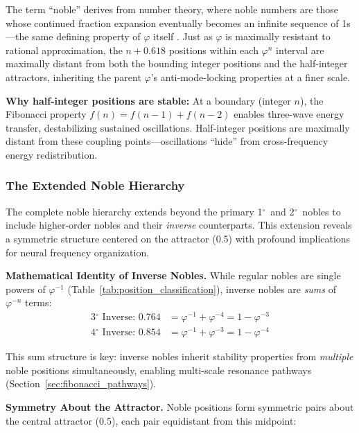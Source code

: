 \documentclass[11pt,a4paper]{article}
\newcommand{\degree}{$^\circ$}  %
\newcommand{\phisym}{\varphi}
\begin{document}
The term ``noble'' derives from number theory, where noble numbers are those whose continued fraction expansion eventually becomes an infinite sequence of 1s---the same defining property of $\phisym$ itself \parencite{hardy1979introduction}. Just as $\phisym$ is maximally resistant to rational approximation, the $n + 0.618$ positions within each $\phisym^n$ interval are maximally distant from both the bounding integer positions and the half-integer attractors, inheriting the parent $\phisym$'s anti-mode-locking properties at a finer scale.

\textbf{Why half-integer positions are stable:} At a boundary (integer $n$), the Fibonacci property $f(n) = f(n-1) + f(n-2)$ enables three-wave energy transfer, destabilizing sustained oscillations. Half-integer positions are maximally distant from these coupling points---oscillations ``hide'' from cross-frequency energy redistribution.

\subsubsection{The Extended Noble Hierarchy}
\label{sec:extended_noble}

The complete noble hierarchy extends beyond the primary 1\degree\ and 2\degree\ nobles to include higher-order nobles and their \textit{inverse} counterparts. This extension reveals a symmetric structure centered on the attractor (0.5) with profound implications for neural frequency organization.

\textbf{Mathematical Identity of Inverse Nobles.}
While regular nobles are single powers of $\phisym^{-1}$ (Table~\ref{tab:position_classification}), inverse nobles are \textit{sums} of $\phisym^{-n}$ terms:
\begin{align}
\text{3\degree\ Inverse: } 0.764 &= \phisym^{-1} + \phisym^{-4} = 1 - \phisym^{-3} \\
\text{4\degree\ Inverse: } 0.854 &= \phisym^{-1} + \phisym^{-3} = 1 - \phisym^{-4}
\end{align}

This sum structure is key: inverse nobles inherit stability properties from \textit{multiple} noble positions simultaneously, enabling multi-scale resonance pathways (Section~\ref{sec:fibonacci_pathways}).

\textbf{Symmetry About the Attractor.}
Noble positions form symmetric pairs about the central attractor (0.5), each pair equidistant from this midpoint:
\end{document}
